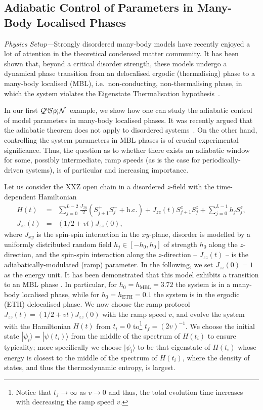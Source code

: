 \documentclass{SciPost}
\newcommand\0{\scalebox{-1}[1]{0}}
\newcommand{\qspin}{$\mathcal{Q}^{\mathrm{u}}\!\mathcal{S}\uprho\mathrm{\text{\textexclamdown}}\mathcal{N}$}
\begin{document}
\subsection{Adiabatic Control of Parameters in Many-Body Localised Phases}
\label{subsec:MBL}

\emph{Physics Setup---}Strongly  disordered many-body models have recently enjoyed a lot of attention in the theoretical condensed matter community. It has been shown that, beyond a critical disorder strength, these models undergo a dynamical phase transition from an delocalised ergodic (thermalising) phase to a many-body localised (MBL), i.e.~non-conducting, non-thermalising phase, in which the system violates the Eigenstate Thermalisation hypothesis~\cite{basko_06,gornyi_05,imbrie_16,oganesyan_07,pal_16,vosk_13,nandkishore_15}. 

In our first \qspin\ example, we show how one can study the adiabatic control of model parameters in many-body localised phases. It was recently argued that the adiabatic theorem does not apply to disordered systems~\cite{khemani_15}. On the other hand, controlling the system parameters in MBL phases is of crucial experimental\cite{Schreiber15,ovadia_15,bordia_16,smith_16,choi_16} significance. Thus, the question as to whether there exists an adiabatic window for some, possibly intermediate, ramp speeds (as is the case for periodically-driven systems\cite{weinberg_FAPT}), is of particular and increasing importance. 

Let us consider the XXZ open chain in a disordered $z$-field with the time-dependent Hamiltonian
\begin{eqnarray}
H(t) &=& \sum_{j=0}^{L-2}\frac{J_{xy}}{2}\left(S^+_{j+1}S^-_{j} + \mathrm{h.c.}\right) + J_{zz}(t)S^z_{j+1}S^z_{j} + \sum_{j=0}^{L-1}h_jS^z_{j},\nonumber\\
J_{zz}(t) &=&(1/2 + vt)J_{zz}(0),
\label{eq:H_XXZ}
\end{eqnarray}
where $J_{xy}$ is the spin-spin interaction in the $xy$-plane, disorder is modelled by a uniformly distributed random field $h_j\in[-h_0,h_0]$ of strength $h_0$ along the $z$-direction, and the spin-spin interaction along the $z$-direction -- $J_{zz}(t)$ -- is the adiabatically-modulated (ramp) parameter. In the following, we set $J_{zz}(0) = 1$ as the energy unit. It has been demonstrated that this model exhibits a transition to an MBL phase \cite{Luitz15}. In particular, for $h_0=h_\mathrm{MBL}=3.72$ the system is in a many-body localised phase, while for $h_0=h_\mathrm{ETH}=0.1$ the system is in the ergodic (ETH) delocalised phase. We now choose the ramp protocol $J_{zz}(t)=(1/2 + vt)J_{zz}(0)$ with the ramp speed $v$, and evolve the system with the Hamiltonian $H(t)$ from $t_i=0$ to\footnote{Notice that $t_f\to\infty$ as $v\to 0$ and thus, the total evolution time increases with decreasing the ramp speed $v$.} $t_f=(2v)^{-1}$. We choose the initial state $|\psi_i\rangle=|\psi(t_i)\rangle$ from the middle of the spectrum of $H(t_i)$ to ensure typicality; more specifically we choose $|\psi_i\rangle$ to be that eigenstate of $H(t_i)$ whose energy is closest to the middle of the spectrum of $H(t_i)$, where the density of states, and thus the thermodynamic entropy, is largest.  
\end{document}
